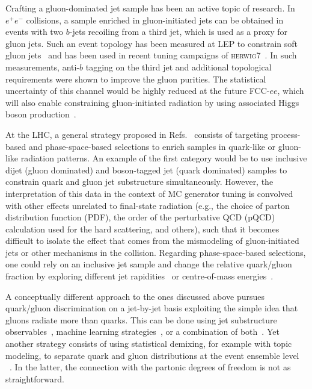 \documentclass[a4paper,11pt]{article}
\newcommand{\hw}{{\textsc{herwig}}7\xspace}
\begin{document}
Crafting a gluon-dominated jet sample has been an active topic of research. In $e^+e^-$ collisions, a sample enriched in gluon-initiated jets can be obtained in events with two $b$-jets recoiling from a third jet, which is used as a proxy for gluon jets. Such an event topology has been measured at LEP to constrain soft gluon jets~\cite{OPAL:1991ssr,OPAL:1993uun,ALEPH:1995oxo, OPAL:1995ab, DELPHI:1995nzf, TOPAZ:1997kkz, OPAL:1999jkz, DELPHI:1999alp, CLEO:1992fdq, Derrick:1985du, ALEPH:1994hlg, OPAL:2001ekk, OPAL:2004prv, OPAL:2003wca} and has been used in recent tuning campaigns of \hw~\cite{Reichelt:2017hts,Mo:2017gzp}. In such measurements, anti-$b$ tagging on the third jet and additional topological requirements were shown to improve the gluon purities. The statistical uncertainty of this channel would be highly reduced at the future FCC-$ee$, which will also enable constraining gluon-initiated radiation by using associated Higgs boson production~\cite{Soyez:2017cwe,dEnterria:2021xij}.

At the LHC, a general strategy proposed in Refs.~\cite{Gallicchio:2011xc,Andersen:2016qtm} consists of targeting process-based and phase-space-based selections to enrich samples in quark-like or gluon-like radiation patterns. An example of the first category would be to use inclusive dijet (gluon dominated) and boson-tagged jet (quark dominated) samples to constrain quark and gluon jet substructure simultaneously. However, the interpretation of this data in the context of MC generator tuning is convolved with other effects unrelated to final-state radiation (e.g., the choice of parton distribution function (PDF), the order of the perturbative QCD (pQCD) calculation used for the hard scattering, and others), such that it becomes difficult to isolate the effect that comes from the mismodeling of gluon-initiated jets or other mechanisms in the collision. Regarding phase-space-based selections, one could rely on an inclusive jet sample and change the relative quark/gluon fraction by exploring different jet rapidities~\cite{ATLAS:2019mgf, Aad:2019onw, Pablos:2022mrx} or centre-of-mass energies~\cite{Baron:2023hkp}. 

A conceptually different approach to the ones discussed above pursues quark/gluon discrimination on a jet-by-jet basis exploiting the simple idea that gluons radiate more than quarks. This can be done using jet substructure observables~\cite{Krohn:2012fg,Frye:2017yrw,Kang:2021ryr,Stewart:2022ari}, machine learning strategies~\cite{Komiske:2016rsd,Dreyer:2020brq,Dolan:2022ikg}, or a combination of both~\cite{Dreyer:2021hhr}. Yet another strategy consists of using statistical demixing, for example with topic modeling, to separate quark and gluon distributions at the event ensemble level ~\cite{Larkoski:2014pca,Metodiev:2018ftz,Komiske:2018vkc,ATLAS:2019mgf,Aad:2019onw,LeBlanc:2022bwd,Komiske:2022vxg}. In the latter, the connection with the partonic degrees of freedom is not as straightforward.
\end{document}
